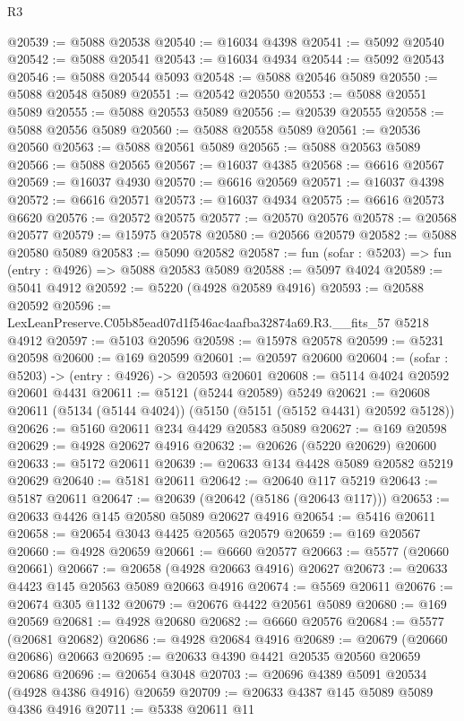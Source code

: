 \begin{lexlean}{R3}
\begin{coremodule}
@20539 := @5088 @20538
@20540 := @16034 @4398
@20541 := @5092 @20540
@20542 := @5088 @20541
@20543 := @16034 @4934
@20544 := @5092 @20543
@20546 := @5088 @20544 @5093
@20548 := @5088 @20546 @5089
@20550 := @5088 @20548 @5089
@20551 := @20542 @20550
@20553 := @5088 @20551 @5089
@20555 := @5088 @20553 @5089
@20556 := @20539 @20555
@20558 := @5088 @20556 @5089
@20560 := @5088 @20558 @5089
@20561 := @20536 @20560
@20563 := @5088 @20561 @5089
@20565 := @5088 @20563 @5089
@20566 := @5088 @20565
@20567 := @16037 @4385
@20568 := @6616 @20567
@20569 := @16037 @4930
@20570 := @6616 @20569
@20571 := @16037 @4398
@20572 := @6616 @20571
@20573 := @16037 @4934
@20575 := @6616 @20573 @6620
@20576 := @20572 @20575
@20577 := @20570 @20576
@20578 := @20568 @20577
@20579 := @15975 @20578
@20580 := @20566 @20579
@20582 := @5088 @20580 @5089
@20583 := @5090 @20582
@20587 := fun (sofar : @5203) => fun (entry : @4926) => @5088 @20583 @5089
@20588 := @5097 @4024
@20589 := @5041 @4912
@20592 := @5220 (@4928 @20589 @4916)
@20593 := @20588 @20592
@20596 := LexLeanPreserve.C05b85ead07d1f546ac4aafba32874a69.R3.__fits_57 @5218 @4912
@20597 := @5103 @20596
@20598 := @15978 @20578
@20599 := @5231 @20598
@20600 := @169 @20599
@20601 := @20597 @20600
@20604 := (sofar : @5203) -> (entry : @4926) -> @20593 @20601
@20608 := @5114 @4024 @20592 @20601 @4431
@20611 := @5121 (@5244 @20589) @5249
@20621 := @20608 @20611 (@5134 (@5144 @4024)) (@5150 (@5151 (@5152 @4431) @20592 @5128))
@20626 := @5160 @20611 @234 @4429 @20583 @5089
@20627 := @169 @20598
@20629 := @4928 @20627 @4916
@20632 := @20626 (@5220 @20629) @20600
@20633 := @5172 @20611
@20639 := @20633 @134 @4428 @5089 @20582 @5219 @20629
@20640 := @5181 @20611
@20642 := @20640 @117 @5219
@20643 := @5187 @20611
@20647 := @20639 (@20642 (@5186 (@20643 @117)))
@20653 := @20633 @4426 @145 @20580 @5089 @20627 @4916
@20654 := @5416 @20611
@20658 := @20654 @3043 @4425 @20565 @20579
@20659 := @169 @20567
@20660 := @4928 @20659
@20661 := @6660 @20577
@20663 := @5577 (@20660 @20661)
@20667 := @20658 (@4928 @20663 @4916) @20627
@20673 := @20633 @4423 @145 @20563 @5089 @20663 @4916
@20674 := @5569 @20611
@20676 := @20674 @305 @1132
@20679 := @20676 @4422 @20561 @5089
@20680 := @169 @20569
@20681 := @4928 @20680
@20682 := @6660 @20576
@20684 := @5577 (@20681 @20682)
@20686 := @4928 @20684 @4916
@20689 := @20679 (@20660 @20686) @20663
@20695 := @20633 @4390 @4421 @20535 @20560 @20659 @20686
@20696 := @20654 @3048
@20703 := @20696 @4389 @5091 @20534 (@4928 @4386 @4916) @20659
@20709 := @20633 @4387 @145 @5089 @5089 @4386 @4916
@20711 := @5338 @20611 @11

\end{coremodule}
\end{lexlean}
